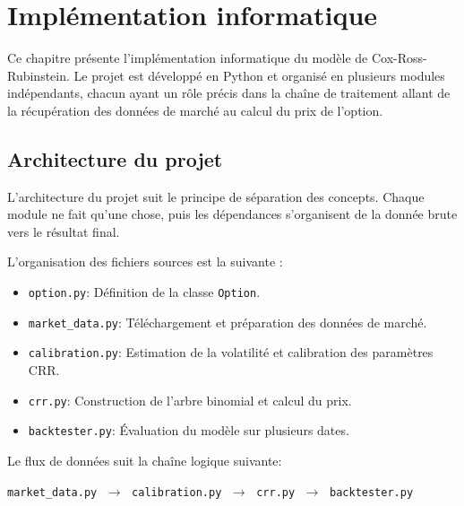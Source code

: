 \documentclass[11pt]{report}
\begin{document}

\chapter{Implémentation informatique}

Ce chapitre présente l'implémentation informatique du modèle de Cox-Ross-Rubinstein.
Le projet est développé en Python et organisé en plusieurs modules indépendants,
chacun ayant un rôle précis dans la chaîne de traitement allant de la récupération
des données de marché au calcul du prix de l'option.

\section{Architecture du projet}

L'architecture du projet suit le principe de séparation des concepts. Chaque module ne fait qu'une chose, puis les dépendances s'organisent de la donnée brute vers le résultat final.

L'organisation des fichiers sources est la suivante :

\begin{itemize}
    \item \texttt{option.py}: Définition de la classe \texttt{Option}.
    \item \texttt{market\_data.py}: Téléchargement et préparation des données de marché.
    \item \texttt{calibration.py}: Estimation de la volatilité et calibration des paramètres CRR.
    \item \texttt{crr.py}: Construction de l'arbre binomial et calcul du prix.
    \item \texttt{backtester.py}: Évaluation du modèle sur plusieurs dates.
\end{itemize}

Le flux de données suit la chaîne logique suivante:

\begin{center}
\texttt{market\_data.py}
$\;\longrightarrow\;$
\texttt{calibration.py}
$\;\longrightarrow\;$
\texttt{crr.py}
$\;\longrightarrow\;$
\texttt{backtester.py}
\end{center}
\end{document}
